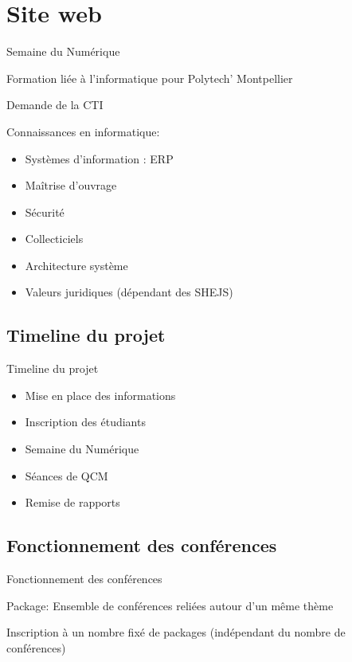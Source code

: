 \section{Site web}

\begin{frame}{Semaine du Numérique}

    Formation liée à l'informatique pour Polytech' Montpellier

    Demande de la CTI

    Connaissances en informatique:
    \begin{itemize}
    \item Systèmes d’information : ERP
    \item Maîtrise d’ouvrage
    \item Sécurité
    \item Collecticiels
    \item Architecture système
    \item Valeurs juridiques (dépendant des SHEJS)
    \end{itemize}

\end{frame}

\subsection{Timeline du projet}
\begin{frame}{Timeline du projet}

    \begin{itemize}
    \item Mise en place des informations
    \item Inscription des étudiants
    \item Semaine du Numérique
    \item Séances de QCM
    \item Remise de rapports
    \end{itemize}

\end{frame}

\subsection{Fonctionnement des conférences}
\begin{frame}{Fonctionnement des conférences}

    Package: Ensemble de conférences reliées autour d'un même thème

    Inscription à un nombre fixé de packages (indépendant du nombre de conférences)

\end{frame}

